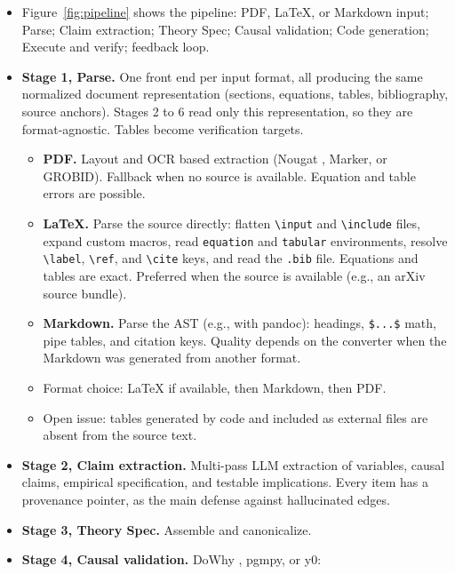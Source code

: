   \begin{itemize}
  \tightlist
  \item
    Figure~\ref{fig:pipeline} shows the pipeline: PDF, LaTeX, or Markdown
    input; Parse; Claim extraction; Theory Spec; Causal validation; Code
    generation; Execute and verify; feedback loop.
  \item
    \textbf{Stage 1, Parse.} One front end per input format, all producing
    the same normalized document representation (sections, equations,
    tables, bibliography, source anchors). Stages 2 to 6 read only this
    representation, so they are format-agnostic. Tables become
    verification targets.

    \begin{itemize}
    \tightlist
    \item
      \textbf{PDF.} Layout and OCR based extraction (Nougat
      \cite{blecher2023nougat}, Marker, or GROBID). Fallback when no source is available. Equation and table
      errors are possible.
    \item
      \textbf{LaTeX.} Parse the source directly: flatten
      \texttt{\textbackslash{}input} and \texttt{\textbackslash{}include}
      files, expand custom macros, read \texttt{equation} and
      \texttt{tabular} environments, resolve
      \texttt{\textbackslash{}label}, \texttt{\textbackslash{}ref}, and
      \texttt{\textbackslash{}cite} keys, and read the \texttt{.bib} file.
      Equations and tables are exact. Preferred when the source is
      available (e.g., an arXiv source bundle).
    \item
      \textbf{Markdown.} Parse the AST (e.g., with pandoc): headings,
      \texttt{\$...\$} math, pipe tables, and citation keys. Quality
      depends on the converter when the Markdown was generated from
      another format.
    \item
      Format choice: LaTeX if available, then Markdown, then PDF.
    \item
      Open issue: tables generated by code and included as external files
      are absent from the source text.
    \end{itemize}
  \item
    \textbf{Stage 2, Claim extraction.} Multi-pass LLM extraction of
    variables, causal claims, empirical specification, and testable
    implications. Every item has a provenance pointer, as the main defense
    against hallucinated edges.
  \item
    \textbf{Stage 3, Theory Spec.} Assemble and canonicalize.
  \item
    \textbf{Stage 4, Causal validation.} DoWhy \cite{sharma2020dowhy},
    pgmpy, or y0:


\end{itemize}
